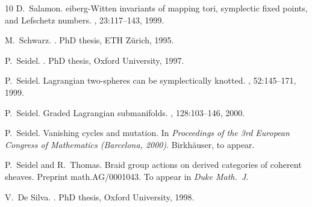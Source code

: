 \documentclass[10pt,letterpaper]{article}
\begin{document}
\begin{thebibliography}{10}
D.~Salamon.
eiberg-{W}itten invariants of mapping tori, symplectic fixed
  points, and {L}efschetz numbers.
, 23:117--143, 1999.

M.~Schwarz.
.
\newblock PhD thesis, {ETH} {Z}{\"u}rich, 1995.

P.~Seidel.
.
\newblock PhD thesis, Oxford University, 1997.

P.~Seidel.
\newblock Lagrangian two-spheres can be symplectically knotted.
, 52:145--171, 1999.

P.~Seidel.
\newblock Graded {L}agrangian submanifolds.
, 128:103--146, 2000.

P.~Seidel.
\newblock Vanishing cycles and mutation.
\newblock In {\em Proceedings of the 3rd European Congress of Mathematics
  (Barcelona, 2000)}. Birkh{\"a}user, to appear.

P.~Seidel and R.~Thomas.
\newblock Braid group actions on derived categories of coherent sheaves.
\newblock Preprint math.AG/0001043. To appear in {\em Duke Math.\ J}.

V.~De Silva.
.
\newblock PhD thesis, Oxford University, 1998.

\end{thebibliography}
\end{document}
